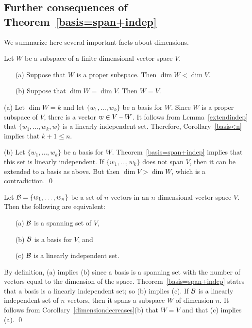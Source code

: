 \documentclass{ximera}
\begin{document}
\subsection*{Further consequences of Theorem~\ref{basis=span+indep}}

We summarize here several important facts about dimensions.

\begin{cor}  \label{dimensiondecreases}
Let $W$ be a subspace of a finite dimensional vector space $V$.
\begin{itemize}
\item[(a)]   Suppose that $W$ is a proper subspace.
Then $\dim W < \dim V$.
\item[(b)]   Suppose that $\dim W = \dim V$.  Then $W=V$.
\end{itemize}
\end{cor}

\proof
(a) Let $\dim W = k$ and let $\{w_1,\ldots,w_k\}$ be a basis for
$W$.  Since $W$ is a proper subspace of $V$, there is a vector
$w\in V\;\mbox{--}\; W$.  It follows from Lemma~\ref{extendindep} that
$\{w_1,\ldots,w_k,w\}$ is a linearly independent set.  Therefore,
Corollary~\ref{basis<n} implies that $k+1\le n$.

(b) Let $\{w_1,\ldots,w_k\}$ be a basis for $W$.
Theorem~\ref{basis=span+indep} implies that this set is linearly
independent.  If $\{w_1,\ldots,w_k\}$ does not span $V$, then it
can be extended to a basis as above.  But then $\dim V > \dim W$,
which is a contradiction.  \qed

\begin{cor} \label{C:dim=n}
Let ${\cal B}=\{w_1,\ldots,w_n\}$ be a set of $n$ vectors in an
$n$-dimensional vector space $V$.  Then the following are equivalent:
\begin{itemize}
\item[(a)]  ${\cal B}$ is a spanning set of $V$, 
\item[(b)]  ${\cal B}$ is a basis for $V$, and 
\item[(c)] ${\cal B}$ is a linearly independent set.
\end{itemize}
\end{cor}

\proof    By definition, (a) implies (b) since a basis is a spanning
set with the number of vectors equal to the dimension of the space.
Theorem~\ref{basis=span+indep} states that a basis is a linearly
independent set; so (b) implies (c). If ${\cal B}$ is a linearly
independent set of $n$ vectors, then it spans a subspace $W$ of
dimension $n$.  It follows from Corollary~\ref{dimensiondecreases}(b)
that $W=V$ and that (c) implies (a).  \qed
\end{document}
